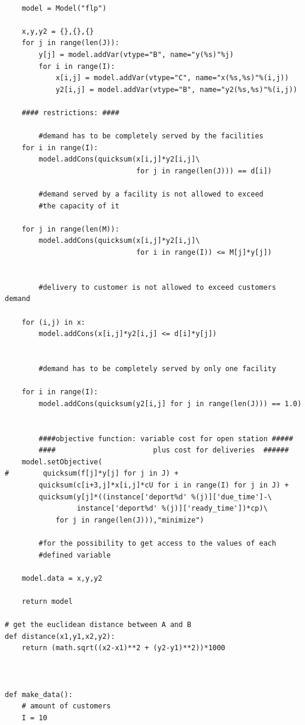 \documentclass[a4paper,12pt,parskip,bibtotoc,liststotoc]{article}
\begin{document}
\begin{appendix}
\begin{lstlisting}
        
    model = Model("flp")

    x,y,y2 = {},{},{}
    for j in range(len(J)):
        y[j] = model.addVar(vtype="B", name="y(%s)"%j)
        for i in range(I):
            x[i,j] = model.addVar(vtype="C", name="x(%s,%s)"%(i,j))
            y2[i,j] = model.addVar(vtype="B", name="y2(%s,%s)"%(i,j))
    
    #### restrictions: ####
    
        #demand has to be completely served by the facilities
    for i in range(I):
        model.addCons(quicksum(x[i,j]*y2[i,j]\
                               for j in range(len(J))) == d[i]) 
        
        #demand served by a facility is not allowed to exceed 
        #the capacity of it
        
    for j in range(len(M)):
        model.addCons(quicksum(x[i,j]*y2[i,j]\
                               for i in range(I)) <= M[j]*y[j])
        
        
        #delivery to customer is not allowed to exceed customers demand

    for (i,j) in x:
        model.addCons(x[i,j]*y2[i,j] <= d[i]*y[j])
        
        
        #demand has to be completely served by only one facility
    
    for i in range(I):
        model.addCons(quicksum(y2[i,j] for j in range(len(J))) == 1.0)
        

        ####objective function: variable cost for open station #####
        ####                       plus cost for deliveries  ######      
    model.setObjective(
#        quicksum(f[j]*y[j] for j in J) +
        quicksum(c[i+3,j]*x[i,j]*cU for i in range(I) for j in J) + 
        quicksum(y[j]*((instance['deport%d' %(j)]['due_time']-\
                 instance['deport%d' %(j)]['ready_time'])*cp)\
            for j in range(len(J))),"minimize")
            
        #for the possibility to get access to the values of each 
        #defined variable
            
    model.data = x,y,y2

    return model

# get the euclidean distance between A and B
def distance(x1,y1,x2,y2):
    return (math.sqrt((x2-x1)**2 + (y2-y1)**2))*1000



def make_data():
    # amount of customers
    I = 10
    

\end{lstlisting}
\end{appendix}
\end{document}
